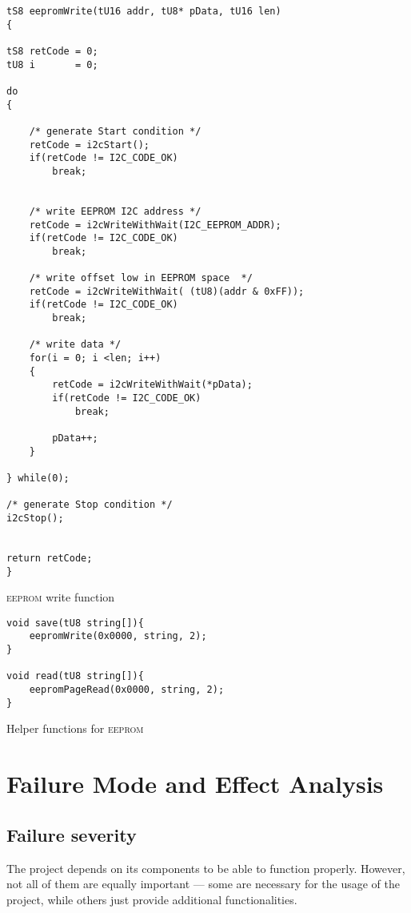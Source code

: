\documentclass[10pt]{article}
\begin{document}
\begin{program}[h]
    \begin{lstlisting}
tS8 eepromWrite(tU16 addr, tU8* pData, tU16 len)
{

tS8 retCode = 0;
tU8 i       = 0;

do
{

    /* generate Start condition */
    retCode = i2cStart();
    if(retCode != I2C_CODE_OK)
        break;


    /* write EEPROM I2C address */
    retCode = i2cWriteWithWait(I2C_EEPROM_ADDR);
    if(retCode != I2C_CODE_OK)
        break;

    /* write offset low in EEPROM space  */
    retCode = i2cWriteWithWait( (tU8)(addr & 0xFF));
    if(retCode != I2C_CODE_OK)
        break;

    /* write data */
    for(i = 0; i <len; i++)
    {
        retCode = i2cWriteWithWait(*pData);
        if(retCode != I2C_CODE_OK)
            break;

        pData++;
    }

} while(0);

/* generate Stop condition */
i2cStop();


return retCode;
} 
    \end{lstlisting}
    \caption{\textsc{eeprom} write function}
\end{program}

\begin{program}[h]
    \begin{lstlisting}
void save(tU8 string[]){
    eepromWrite(0x0000, string, 2);
}

void read(tU8 string[]){
    eepromPageRead(0x0000, string, 2);
}
    \end{lstlisting}
    \caption{Helper functions for \textsc{eeprom}}
\end{program}

\clearpage
\section{Failure Mode and Effect Analysis}

\subsection{Failure severity}

The project depends on its components to be able to function properly.
However, not all of them are equally important --- some are necessary for the usage of the project,
while others just provide additional functionalities.
\end{document}
